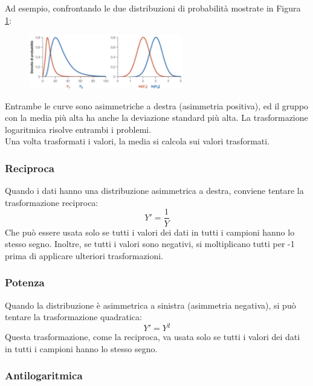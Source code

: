 \documentclass[10pt, draft]{book}
\begin{document}
Ad esempio, confrontando le due distribuzioni di probabilità mostrate in Figura \ref{fig13.3-1}:\\
\begin{figure}[H]
    \centering
    \includegraphics[width=0.6\textwidth]{fig13.3-1}
    \caption{\small{}}
    \label{fig13.3-1}
\end{figure}

Entrambe le curve sono asimmetriche a destra (asimmetria positiva), ed il gruppo con la media più alta ha anche la deviazione standard più alta. La trasformazione logaritmica risolve entrambi i problemi.\\
Una volta trasformati i valori, la media si calcola sui valori trasformati.

\subsubsection{Reciproca}

Quando i dati hanno una distribuzione asimmetrica a destra, conviene tentare la trasformazione reciproca:
\begin{equation}
    Y' = \frac{1}{Y}
\end{equation}
Che può essere usata solo se tutti i valori dei dati in tutti i campioni hanno lo stesso segno. Inoltre, se tutti i valori sono negativi, si moltiplicano tutti per -1 prima di applicare ulteriori trasformazioni.

\subsubsection{Potenza}

Quando la distribuzione è asimmetrica a sinistra (asimmetria negativa), si può tentare la trasformazione quadratica:
\begin{equation}
    Y' = Y^2
\end{equation}
Questa trasformazione, come la reciproca, va usata solo se tutti i valori dei dati in tutti i campioni hanno lo stesso segno.

\subsubsection{Antilogaritmica}
\end{document}
